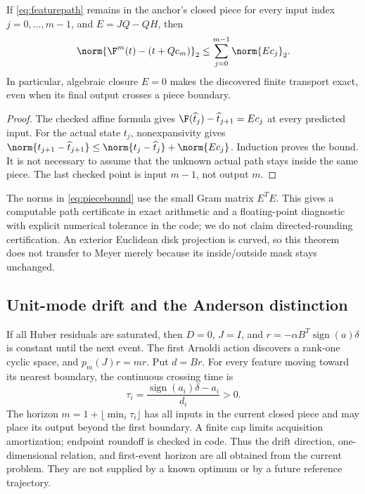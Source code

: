 \begin{theorem}\label{thm:piece}
If \eqref{eq:featurepath} remains in the anchor's closed piece for every
input index $j=0,\ldots,m-1$, and $E=JQ-QH$, then
\begin{equation}
 \norm{\F^m(t)-(t+Qc_m)}_2
 \leq \sum_{j=0}^{m-1}\norm{Ec_j}_2. \label{eq:piecebound}
\end{equation}
In particular, algebraic closure $E=0$ makes the discovered finite
transport exact, even when its final output crosses a piece boundary.
\end{theorem}
\begin{proof}
The checked affine formula gives
$\F(\widehat t_j)-\widehat t_{j+1}=Ec_j$ at every predicted input.
For the actual state $t_j$, nonexpansivity gives
$\norm{t_{j+1}-\widehat t_{j+1}}
\leq\norm{t_j-\widehat t_j}+\norm{Ec_j}$.
Induction proves the bound. It is not necessary to assume that the
unknown actual path stays inside the same piece. The last checked point
is input $m-1$, not output $m$.
\end{proof}

The norms in \eqref{eq:piecebound} use the small Gram matrix $E^TE$.
This gives a computable path certificate in exact arithmetic and a
floating-point diagnostic with explicit numerical tolerance in the code;
we do not claim directed-rounding certification. An exterior Euclidean
disk projection is curved, so this theorem does not transfer to Meyer
merely because its inside/outside mask stays unchanged.

\subsection{Unit-mode drift and the Anderson distinction}
If all Huber residuals are saturated, then $D=0$, $J=I$, and
$r=-\alpha B^T\operatorname{sign}(a)\delta$ is constant until the next event.
The first Arnoldi action discovers a rank-one cyclic space, and
$p_m(J)r=mr$. Put $d=Br$. For every feature moving toward its nearest
boundary, the continuous crossing time is
\[
 \tau_i=\frac{\operatorname{sign}(a_i)\delta-a_i}{d_i}>0.
\]
The horizon $m=1+\lfloor\min_i\tau_i\rfloor$ has all inputs in the current
closed piece and may place its output beyond the first boundary. A finite
cap limits acquisition amortization; endpoint roundoff is checked in code.
Thus the drift direction, one-dimensional relation, and first-event horizon
are all obtained from the current problem. They are not supplied by a
known optimum or by a future reference trajectory.

